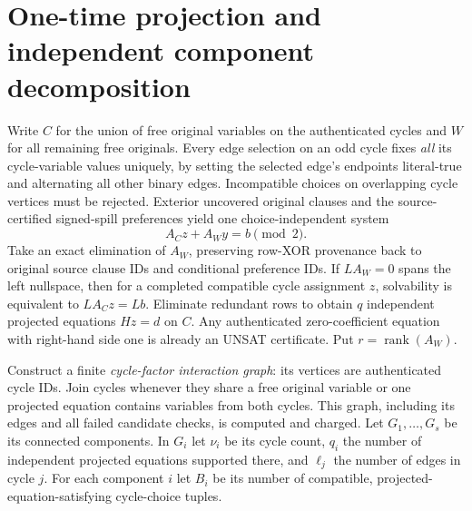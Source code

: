 \documentclass[11pt]{article}
\begin{document}
\section{One-time projection and independent component decomposition}
Write $C$ for the union of free original variables on the authenticated cycles and $W$ for all remaining free originals. Every edge selection on an odd cycle fixes \emph{all} its cycle-variable values uniquely, by setting the selected edge's endpoints literal-true and alternating all other binary edges. Incompatible choices on overlapping cycle vertices must be rejected. Exterior uncovered original clauses and the source-certified signed-spill preferences yield one choice-independent system
\[
 A_Cz+A_Wy=b\pmod2.
\]
Take an exact elimination of $A_W$, preserving row-XOR provenance back to original source clause IDs and conditional preference IDs. If $L A_W=0$ spans the left nullspace, then for a completed compatible cycle assignment $z$, solvability is equivalent to $L A_Cz=Lb$. Eliminate redundant rows to obtain $q$ independent projected equations $Hz=d$ on $C$. Any authenticated zero-coefficient equation with right-hand side one is already an UNSAT certificate. Put $r=\operatorname{rank}(A_W)$.

Construct a finite \emph{cycle-factor interaction graph}: its vertices are authenticated cycle IDs. Join cycles whenever they share a free original variable or one projected equation contains variables from both cycles. This graph, including its edges and all failed candidate checks, is computed and charged. Let $G_1,\ldots,G_s$ be its connected components. In $G_i$ let $\nu_i$ be its cycle count, $q_i$ the number of independent projected equations supported there, and $\ell_j$ the number of edges in cycle $j$. For each component $i$ let $B_i$ be its number of compatible, projected-equation-satisfying cycle-choice tuples.
\end{document}
